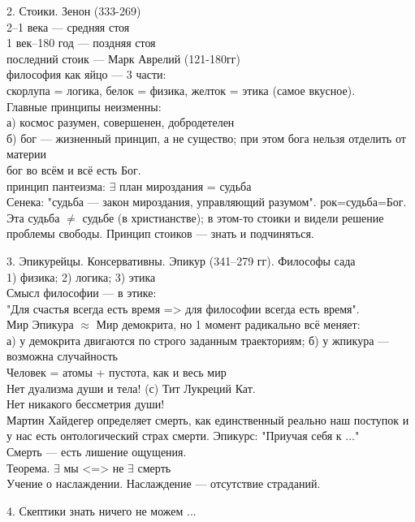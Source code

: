 \documentclass[a4paper,12pt]{article}
\begin{document}
2. Стоики. Зенон (333-269)\\
2--1 века --- средняя стоя\\
1 век--180 год --- поздняя стоя\\
последний стоик --- Марк Аврелий (121-180гг)\\
философия как яйцо --- 3 части:\\
скорлупа = логика, белок = физика, желток = этика (самое вкусное).\\
Главные принципы неизменны:\\
а) космос разумен, совершенен, добродетелен\\
б) бог --- жизненный принцип, а не существо; при этом бога нельзя отделить от материи\\
бог во всём и всё есть Бог.\\
принцип пантеизма: $\exists$ план мироздания = судьба\\
Сенека: "судьба --- закон мироздания, управляющий разумом". рок=судьба=Бог. Эта судьба $\neq$ судьбе (в христианстве); в этом-то стоики и видели решение проблемы свободы. Принцип стоиков --- знать и подчиняться.

3. Эпикурейцы. Консервативны. Эпикур (341--279 гг). Философы сада\\
1) физика; 2) логика; 3) этика\\
Смысл философии --- в этике:\\
"Для счастья всегда есть время => для философии всегда есть время".\\
Мир Эпикура $\approx$ Мир демокрита, но 1 момент радикально всё меняет:\\
а) у демокрита двигаются по строго заданным траекториям;
б) у жпикура --- возможна случайность\\
Человек = атомы + пустота, как и весь мир\\
Нет дуализма души и тела! (с) Тит Лукреций Кат.\\
Нет никакого бессметрия души!\\
Мартин Хайдегер определяет смерть, как единственный реально наш поступок и у нас есть онтологический страх смерти. Эпикурс: "Приучая себя к ..."\\
Смерть --- есть лишение ощущения. \\
Теорема. $\exists$ мы <=> не $\exists$ смерть\\
Учение о наслаждении. Наслаждение --- отсутствие страданий.

4. Скептики знать ничего не можем ...
\end{document}
